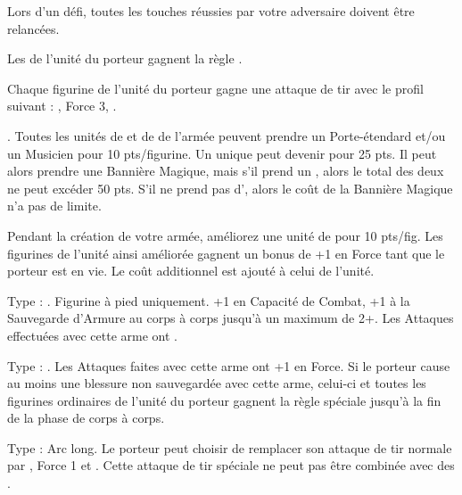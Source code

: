 \begin{multicols}{2}
\startpricelistNSP

 Lors d'un défi, toutes les touches réussies par votre adversaire doivent être relancées.

 Les \dryads{} de l'unité du porteur gagnent la règle \hatred{}.

Chaque figurine de l'unité du porteur gagne une attaque de tir avec le profil suivant : , Force 3, .

. Toutes les unités de \dryads et de \thicketbeasts{} de l'armée peuvent prendre un Porte-étendard et/ou un Musicien pour 10 pts/figurine. Un unique \thicketshepherd{} peut devenir \bsb{} pour 25 pts. Il peut alors prendre une Bannière Magique, mais s'il prend un \aspectofnature{}, alors le total des deux ne peut excéder 50 pts. S'il ne prend pas d'\aspectofnature{}, alors le coût de la Bannière Magique n'a pas de limite.

Pendant la création de votre armée, améliorez une unité de \thicketbeasts{} pour 10 pts/fig. Les figurines de l'unité ainsi améliorée gagnent un bonus de +1 en Force  tant que le porteur est en vie. Le coût additionnel est ajouté à celui de l'unité.

\endpricelistNSP
\end{multicols}

\closearmynewsection

\startarmymagicalitems

\armymagicalweapons

\startpricelist

Type : \gw{}. Figurine à pied uniquement. +1 en Capacité de Combat, +1 à la Sauvegarde d'Armure au corps à corps jusqu'à un maximum de 2+. Les Attaques effectuées avec cette arme ont .

Type : \spear{}. Les Attaques faites avec cette arme ont +1 en Force. Si le porteur cause au moins une blessure non sauvegardée avec cette arme, celui-ci et toutes les figurines ordinaires de l'unité du porteur gagnent la règle spéciale \distracting{} jusqu'à la fin de la phase de corps à corps.

Type : Arc long. Le porteur peut choisir de remplacer son attaque de tir normale par , Force 1 et \poisonedattacks{}. Cette attaque de tir spéciale ne peut pas être combinée avec des \feyarrows{}.


